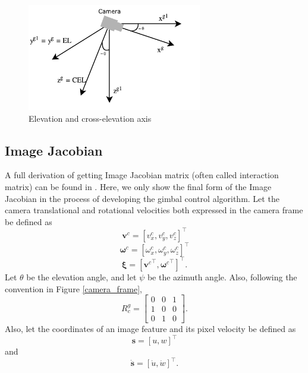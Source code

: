 \begin{figure}[htbp]
	\centering
	\includegraphics[width = 3in]{images/chapter2/cross_elevation.pdf}
	\caption{Elevation and cross-elevation axis}
	\label{cross_elevation}
\end{figure}
\subsection{Image Jacobian}
A full derivation of getting Image Jacobian matrix (often called interaction matrix) can be found in \cite{spong2006robot}. Here, we only show the final form of the Image Jacobian in the process of developing the gimbal control algorithm. Let the camera translational and rotational velocities both expressed in the camera frame be defined as
\begin{equation}
\mathbf{v}^c=[v_x^c, v_y^c, v_z^c]^\top
\end{equation}
\begin{equation}
\mathbf{\omega}^c=[\omega_x^c, \omega_y^c, \omega_z^c]^\top
\end{equation}
\begin{equation}
\mathbf{\xi}=[{\mathbf{v}^c}^\top, {\mathbf{\omega}^c}^\top]^\top.
\label{camera_velocity}
\end{equation}
Let $\theta$ be the elevation angle, and let $\psi$ be the azimuth angle. Also, following the convention in Figure \ref{camera_frame}, 
\begin{equation}
R^{g}_c =
\begin{bmatrix}
0 & 0 & 1 \\
1 & 0 & 0 \\
0 & 1 & 0
\end{bmatrix}.
\end{equation}
Also, let the coordinates of an image feature and its pixel velocity be defined as 
\begin{equation}
\mathbf{s}=[u, w]^\top
\end{equation}
and 
\begin{equation}
\mathbf{\dot{s}}=[\dot{u}, \dot{w}]^\top.
\label{image_feature_velocity}
\end{equation}
